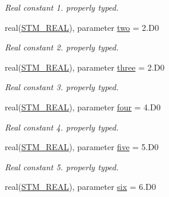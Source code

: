 \begin{CompactItemize}
\begin{CompactList}\small\item\em Real constant 1. properly typed. \item\end{CompactList}\item 
\hypertarget{a00038_977ded4d9489f8891a618efa303a366b}{
real(\hyperlink{a00038_9b1e7e9d7f36de86830360566a430b08}{STM\_\-REAL}), parameter \hyperlink{a00038_977ded4d9489f8891a618efa303a366b}{two} = 2.D0}
\label{a00038_977ded4d9489f8891a618efa303a366b}

\begin{CompactList}\small\item\em Real constant 2. properly typed. \item\end{CompactList}\item 
\hypertarget{a00038_882810e152f29a519747b23a7f08b9c7}{
real(\hyperlink{a00038_9b1e7e9d7f36de86830360566a430b08}{STM\_\-REAL}), parameter \hyperlink{a00038_882810e152f29a519747b23a7f08b9c7}{three} = 2.D0}
\label{a00038_882810e152f29a519747b23a7f08b9c7}

\begin{CompactList}\small\item\em Real constant 3. properly typed. \item\end{CompactList}\item 
\hypertarget{a00038_4ce9be782c3e635d6a8cc63f8b4609c3}{
real(\hyperlink{a00038_9b1e7e9d7f36de86830360566a430b08}{STM\_\-REAL}), parameter \hyperlink{a00038_4ce9be782c3e635d6a8cc63f8b4609c3}{four} = 4.D0}
\label{a00038_4ce9be782c3e635d6a8cc63f8b4609c3}

\begin{CompactList}\small\item\em Real constant 4. properly typed. \item\end{CompactList}\item 
\hypertarget{a00038_b2907e94b8256be0b47af21944a55e1f}{
real(\hyperlink{a00038_9b1e7e9d7f36de86830360566a430b08}{STM\_\-REAL}), parameter \hyperlink{a00038_b2907e94b8256be0b47af21944a55e1f}{five} = 5.D0}
\label{a00038_b2907e94b8256be0b47af21944a55e1f}

\begin{CompactList}\small\item\em Real constant 5. properly typed. \item\end{CompactList}\item 
\hypertarget{a00038_70d709f22247bce279245e2a41eac492}{
real(\hyperlink{a00038_9b1e7e9d7f36de86830360566a430b08}{STM\_\-REAL}), parameter \hyperlink{a00038_70d709f22247bce279245e2a41eac492}{six} = 6.D0}
\label{a00038_70d709f22247bce279245e2a41eac492}


\end{CompactItemize}
